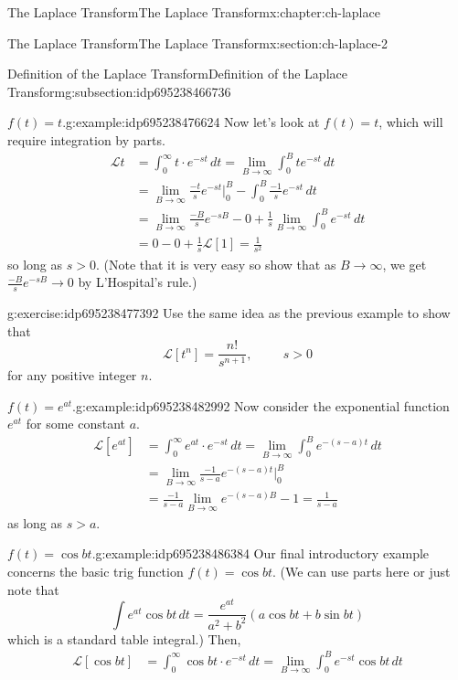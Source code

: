 \documentclass[oneside,10pt,]{book}
\numberwithin{equation}{section}
\numberwithin{equation}{section}
\newcommand{\amp}{&}
\begin{document}
\begin{chapterptx}{The Laplace Transform}{}{The Laplace Transform}{}{}{x:chapter:ch-laplace}
\begin{sectionptx}{The Laplace Transform}{}{The Laplace Transform}{}{}{x:section:ch-laplace-2}
\begin{subsectionptx}{Definition of the Laplace Transform}{}{Definition of the Laplace Transform}{}{}{g:subsection:idp695238466736}
\begin{example}{\(f(t) = t\).}{g:example:idp695238476624}
Now let's look at \(f(t) = t\), which will require integration by parts.%
\begin{align*}
\mathcal{L}{t} \amp= \int_0^\infty t \cdot e^{-st} \, dt = \lim_{B \to \infty} \int_0^B t e^{-st} \, dt\\
\amp= \lim_{B \to \infty} \frac{-t}{s} e^{-st}\bigg\rvert_0^B - \int_0^B \frac{-1}{s}e^{-st}\, dt\\
\amp = \lim_{B \to \infty} \frac{-B}{s} e^{-sB} - 0 + \frac{1}{s} \lim_{B \to \infty} \int_0^B e^{-st}\, dt\\
\amp= 0 - 0 + \frac{1}{s}\mathcal{L}[1] = \frac{1}{s^2}
\end{align*}
so long as \(s > 0\). (Note that it is very easy so show that as \(B \to \infty\), we get \(\frac{-B}{s}e^{-sB} \to 0\) by L'Hospital's rule.)%
\end{example}
\begin{inlineexercise}{}{g:exercise:idp695238477392}%
Use the same idea as the previous example to show that%
\begin{equation*}
\mathcal{L}[t^n] = \frac{n!}{s^{n+1}}, \hspace{1cm} s > 0
\end{equation*}
for any positive integer \(n\).%
\end{inlineexercise}%
\begin{example}{\(f(t) = e^{at}\).}{g:example:idp695238482992}%
Now consider the exponential function \(e^{at}\) for some constant \(a\).%
\begin{align*}
\mathcal{L}[e^{at}] \amp= \int_0^\infty e^{at} \cdot e^{-st} \, dt = \lim_{B \to \infty} \int_0^B e^{-(s - a)t} \, dt\\
\amp = \lim_{B\to\infty} \frac{-1}{s-a} e^{-(s-a)t} \bigg\rvert_0^B\\
\amp= \frac{-1}{s - a} \lim_{B \to \infty} e^{-(s-a)B} - 1 = \frac{1}{s-a}
\end{align*}
as long as \(s > a\).%
\end{example}
\begin{example}{\(f(t) = \cos bt\).}{g:example:idp695238486384}%
Our final introductory example concerns the basic trig function \(f(t) = \cos bt\). (We can use parts here or just note that%
\begin{equation*}
\int e^{at}\cos{bt} \, dt= \frac{e^{at}}{a^2 + b^2}(a\cos bt + b \sin bt)
\end{equation*}
which is a standard table integral.) Then,%
\begin{align*}
\mathcal{L}[\cos bt] \amp= \int_0^\infty \cos bt \cdot e^{-st} \, dt = \lim_{B \to \infty} \int_0^B e^{-st} \cos bt  \, dt\\

\end{align*}
\end{example}
\end{subsectionptx}
\end{sectionptx}
\end{chapterptx}
\end{document}
